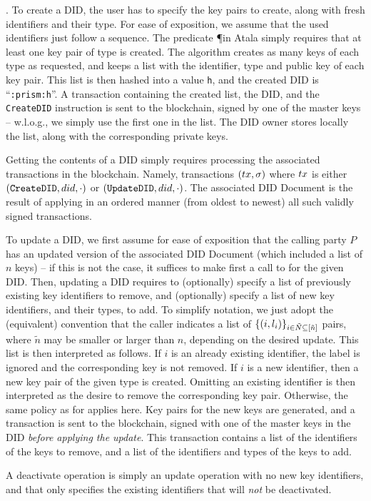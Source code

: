 \begin{description}
\item{.} %
  To create a DID, the user has to specify the key pairs to create, along with
  fresh identifiers and their type. For ease of exposition, we assume that the
  used identifiers just follow a sequence. The predicate \P in Atala simply
  requires that at least one key pair of \MasterKey type is created. The
   algorithm creates as many keys of each type as requested,
  and keeps a list with the identifier, type and public key of each key pair.
  This list is then hashed into a value \texttt{h}, and the created DID is
  ``\texttt{\did:prism:h}''. A transaction containing the created list, the
  DID, and the \texttt{CreateDID} instruction is sent to the blockchain,
  signed by one of the master keys -- w.l.o.g., we simply use the first one
  in the list. The DID owner stores locally the list, along with the
  corresponding private keys.
\item[\uccmd{Read}.] %
  Getting the contents of a DID simply requires processing the associated
  transactions in the blockchain. Namely, transactions $(tx,\sigma)$ where $tx$
  is either $(\texttt{CreateDID},did,\cdot)$ or $(\texttt{UpdateDID},did,
  \cdot)$. The associated DID Document is the result of applying in an ordered
  manner (from oldest to newest) all such validly signed transactions.
\item[\uccmd{Update}.] %
  To update a DID, we first assume for ease of exposition that the calling party
  $P$ has an updated version of the associated DID Document (which included
  a list of $n$ keys) -- if this is not the case, it suffices to make first a
  call to  for the given DID. 
  Then, updating a DID requires to (optionally) specify a list of previously
  existing key identifiers to remove, and (optionally) specify a list of new key
  identifiers, and their types, to add. To simplify notation, we just adopt the
  (equivalent) convention that the caller indicates a list of $\lbrace (i,
  l_i) \rbrace_{i\in\tilde{N}\subseteq[\tilde{n}]}$ pairs, where $\tilde{n}$
  may be smaller or larger than $n$, depending on the desired update. This
  list is then interpreted as follows. If $i$ is an already existing
  identifier, the label is ignored and the corresponding key is not removed. If
  $i$ is a new identifier, then a new key pair of the given type is created.
  Omitting an existing identifier is then interpreted as the desire to remove
  the corresponding key pair. Otherwise, the same policy as for 
  applies here. Key pairs for the new keys are generated, and a transaction is
  sent to the blockchain, signed with one of the master keys in the DID
  \emph{before applying the update}. This transaction contains a list of the
  identifiers of the keys to remove, and a list of the identifiers and types
  of the keys to add.
\item[\uccmd{Deactivate}.] %
  A deactivate operation is simply an update operation with no new key
  identifiers, and that only specifies the existing identifiers that will
  \emph{not} be deactivated.
\end{description}

